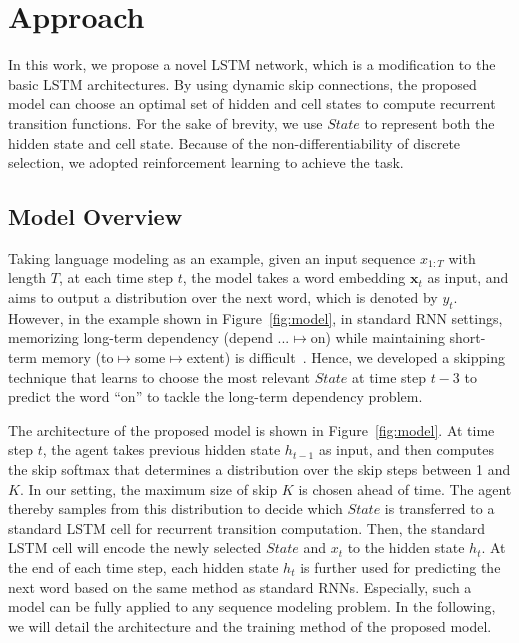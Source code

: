 \documentclass[letterpaper]{article} \usepackage{aaai19}  \usepackage{times}  \usepackage{helvet}  \usepackage{courier}  \usepackage{url}  \usepackage{graphicx}  \usepackage{amsmath}
\begin{document}
\section{Approach}
In this work, we propose a novel LSTM network, which is a modification to the basic LSTM architectures. By using dynamic skip connections, the proposed model can choose an optimal set of hidden and cell states to compute recurrent transition functions. For the sake of brevity, we use $State$ to represent both the hidden state and cell state. Because of the non-differentiability of discrete selection, we adopted reinforcement learning to achieve the task.



\subsection{Model Overview}
Taking language modeling as an example, given an input sequence $x_{1:T}$ with length $T$, at each time step $t$, the model takes a word embedding $\mathbf{x}_t$ as input, and aims to output a distribution over the next word, which is denoted by $y_t$. However, in the example shown in Figure~\ref{fig:model}, in standard RNN settings, memorizing long-term dependency (depend ...$\mapsto$on) while maintaining short-term memory (to$\mapsto$some$\mapsto$extent) is difficult~\cite{chang2017dilated}. Hence, we developed a skipping technique that learns to choose the most relevant $State$ at time step $t-3$ to predict the word ``on'' to tackle the long-term dependency problem.

The architecture of the proposed model is shown in Figure~\ref{fig:model}. At time step $t$, the agent takes previous hidden state $h_{t-1}$ as input, and then computes the skip softmax that determines a distribution over the skip steps between 1 and $K$. In our setting, the maximum size of skip $K$ is chosen ahead of time. The agent thereby samples from this distribution to decide which $State$ is transferred to a standard LSTM cell for recurrent transition computation. Then, the standard LSTM cell will encode the newly selected $State$ and $x_t$ to the hidden state $h_t$. At the end of each time step, each hidden state $h_t$ is further used for predicting the next word based on the same method as standard RNNs. Especially, such a model can be fully applied to any sequence modeling problem. In the following, we will detail the architecture and the training method of the proposed model.
\end{document}
